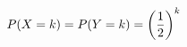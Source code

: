 \documentclass[preview]{standalone}
\begin{document}
\begin{align*}
\special{dvisvgm:raw <g id='unique000'>}P(X=k)=P(Y=k)=\left(\dfrac{1}{2}\right)^k\special{dvisvgm:raw </g>}
\end{align*}
\end{document}
